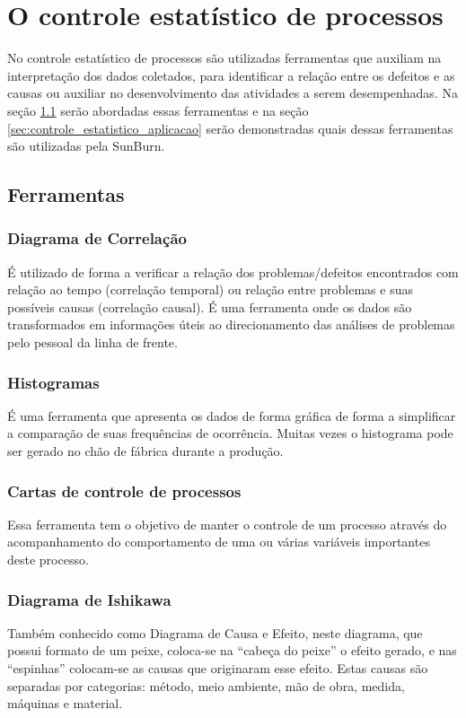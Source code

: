 \chapter{O controle estatístico de processos}
\label{chap:controle_estatistico_de_processos}
No controle estatístico de processos são utilizadas ferramentas que auxiliam na interpretação dos dados coletados, para identificar a relação entre os defeitos e as causas ou auxiliar no desenvolvimento das atividades a serem desempenhadas.  Na seção \ref{sec:controle_estatistico_sec1} serão abordadas essas ferramentas e na seção \ref{sec:controle_estatistico_aplicacao} serão demonstradas quais dessas ferramentas são utilizadas pela SunBurn.


\section{Ferramentas}
\label{sec:controle_estatistico_sec1}

\subsection{Diagrama de Correlação}
É utilizado de forma a verificar a relação dos problemas/defeitos encontrados com relação ao tempo (correlação temporal) ou relação entre problemas e suas possíveis causas (correlação causal). É uma ferramenta onde os dados são transformados em informações úteis ao direcionamento das análises de problemas pelo pessoal da linha de frente.

\subsection{Histogramas}
É uma ferramenta que apresenta os dados de forma gráfica de forma a simplificar a comparação de suas frequências de ocorrência. Muitas vezes o histograma pode ser gerado no chão de fábrica durante a produção.

\subsection{Cartas de controle de processos}
Essa ferramenta tem o objetivo de manter o controle de um processo através do acompanhamento do comportamento de uma ou várias variáveis importantes deste processo.

\subsection{Diagrama de Ishikawa}
Também conhecido como Diagrama de Causa e Efeito, neste diagrama, que possui formato de um peixe, coloca-se na ``cabeça do peixe'' o efeito gerado, e nas ``espinhas'' colocam-se as causas que originaram esse efeito. Estas causas são separadas por categorias: método, meio ambiente, mão de obra, medida, máquinas e material.

